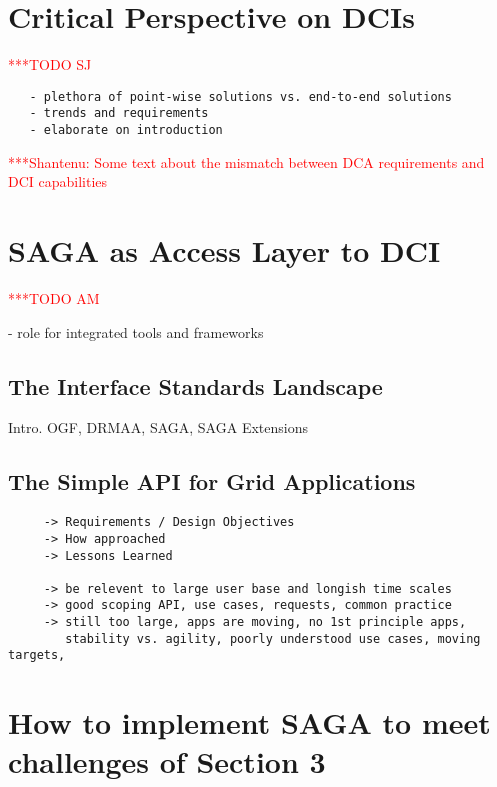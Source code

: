 \documentclass[a4paper,10pt]{article}
\newcommand{\todo}[1]{     {\textcolor{red}  { ***TODO      #1 }}}
\newcommand{\jhanote}[1]{  {\textcolor{red}  { ***Shantenu: #1 }}}
\newcommand{\todo}[1]{}
\newcommand{\jhanote}[1]{}
\begin{document}
\section{Critical Perspective on DCIs}
\todo{SJ}

 \begin{verbatim}
   - plethora of point-wise solutions vs. end-to-end solutions
   - trends and requirements
   - elaborate on introduction
 \end{verbatim}

\jhanote{Some text about the mismatch between DCA requirements and DCI
  capabilities}

\section{SAGA as Access Layer to DCI}
\todo{AM}

 - role for integrated tools and frameworks


 \subsection{The Interface Standards Landscape}
 \label{interface_landscape}

  Intro. OGF, DRMAA, SAGA, SAGA Extensions\\

 \subsection{The Simple API for Grid Applications}

  \begin{verbatim}
     -> Requirements / Design Objectives
     -> How approached
     -> Lessons Learned
  
     -> be relevent to large user base and longish time scales
     -> good scoping API, use cases, requests, common practice
     -> still too large, apps are moving, no 1st principle apps,
        stability vs. agility, poorly understood use cases, moving targets, 

  \end{verbatim}





\section{How to implement SAGA to meet challenges of Section 3}
\label{saga_impls}
\end{document}
